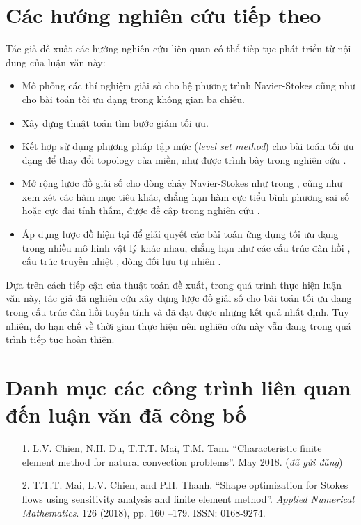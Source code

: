 \chapter*{\centering Các hướng nghiên cứu tiếp theo}
Tác giả đề xuất các hướng nghiên cứu liên quan có thể tiếp tục phát triển từ nội dung của luận văn này:
\begin{itemize}
\item Mô phỏng các thí nghiệm giải số cho hệ phương trình Navier-Stokes cũng như cho bài toán tối ưu dạng trong không gian ba chiều.
\item Xây dựng thuật toán tìm bước giảm tối ưu.
\item Kết hợp sử dụng phương pháp tập mức ({\em level set method}) cho bài toán tối ưu dạng để thay đổi topology của miền, như được trình bày trong nghiên cứu \cite{AJT04}.
\item Mở rộng lược đồ giải số cho dòng chảy Navier-Stokes như trong \cite{DMZ08b}, cũng như xem xét các hàm mục tiêu khác, chẳng hạn hàm cực tiểu bình phương sai số hoặc cực đại tính thấm, được đề cập trong nghiên cứu \cite{ZL08}.
\item Áp dụng lược đồ hiện tại để giải quyết các bài toán ứng dụng tối ưu dạng trong nhiều mô hình vật lý khác nhau, chẳng hạn như các cấu trúc đàn hồi \cite{AJT04, Dap13}, cấu trúc truyền nhiệt \cite{YWM13}, dòng đối lưu tự nhiên \cite{AAA+14}.
\end{itemize}

Dựa trên cách tiếp cận của thuật toán đề xuất, trong quá trình thực hiện luận văn này, tác giả đã nghiên cứu xây dựng lược đồ giải số cho bài toán tối ưu dạng trong cấu trúc đàn hồi tuyến tính và đã đạt được những kết quả nhất định. Tuy nhiên, do hạn chế về thời gian thực hiện nên nghiên cứu này vẫn đang trong quá trình tiếp tục hoàn thiện.

\chapter*{\centering Danh mục các công trình liên quan đến luận văn đã công bố}
\begin{itemize}
\item[1.] L.V. Chien, N.H. Du, T.T.T. Mai, T.M. Tam. “Characteristic finite element method for natural convection problems”. May 2018. ({\em đã gửi đăng})
\item[2.] T.T.T. Mai, L.V. Chien, and P.H. Thanh. “Shape optimization for Stokes flows using sensitivity analysis and finite element method”. \textit{Applied Numerical Mathematics}. 126 (2018), pp. 160 –179. ISSN: 0168-9274.
\end{itemize}

